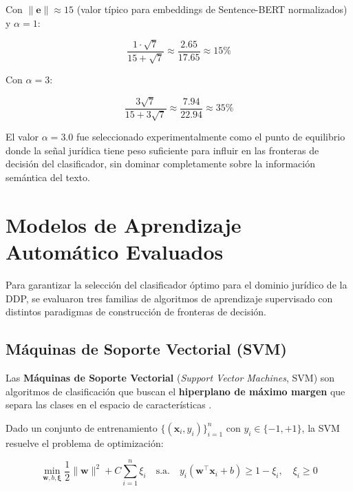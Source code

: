 Con $\|\mathbf{e}\| \approx 15$ (valor típico para embeddings de Sentence-BERT
normalizados) y $\alpha = 1$:

\begin{equation*}
  \frac{1 \cdot \sqrt{7}}{15 + \sqrt{7}} \approx \frac{2.65}{17.65} \approx 15\%
\end{equation*}

Con $\alpha = 3$:

\begin{equation*}
  \frac{3\sqrt{7}}{15 + 3\sqrt{7}} \approx \frac{7.94}{22.94} \approx 35\%
\end{equation*}

El valor $\alpha = 3.0$ fue seleccionado experimentalmente como el punto de
equilibrio donde la señal jurídica tiene peso suficiente para influir en las
fronteras de decisión del clasificador, sin dominar completamente sobre la
información semántica del texto.

\section{Modelos de Aprendizaje Automático Evaluados}

Para garantizar la selección del clasificador óptimo para el dominio jurídico
de la DDP, se evaluaron tres familias de algoritmos de aprendizaje supervisado
con distintos paradigmas de construcción de fronteras de decisión.

\subsection{Máquinas de Soporte Vectorial (SVM)}

Las \textbf{Máquinas de Soporte Vectorial} (\textit{Support Vector Machines},
SVM) son algoritmos de clasificación que buscan el \textbf{hiperplano de máximo
margen} que separa las clases en el espacio de características \cite{cortes1995}.

Dado un conjunto de entrenamiento $\{(\mathbf{x}_i, y_i)\}_{i=1}^n$ con
$y_i \in \{-1, +1\}$, la SVM resuelve el problema de optimización:

\begin{equation}
  \min_{\mathbf{w}, b, \boldsymbol{\xi}}
  \frac{1}{2}\|\mathbf{w}\|^2 + C \sum_{i=1}^n \xi_i
  \quad \text{s.a.} \quad
  y_i(\mathbf{w}^\top \mathbf{x}_i + b) \geq 1 - \xi_i, \quad \xi_i \geq 0
  \label{eq:svm}
\end{equation}

